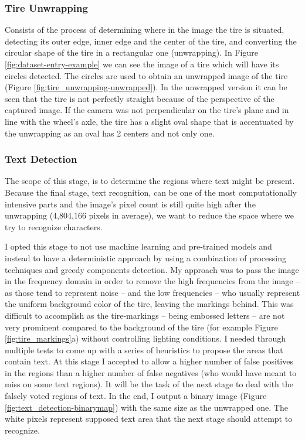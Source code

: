 \subsubsection{Tire Unwrapping}

Consists of the process of determining where in the image the tire is situated, detecting its outer edge, inner edge and the center of the tire, and converting the circular shape of the tire in a rectangular one (unwrapping). In Figure \ref{fig:dataset-entry-example} we can see the image of a tire which will have its circles detected. The circles are used to obtain an unwrapped image of the tire (Figure \ref{fig:tire_unwrapping-unwrapped}). In the unwrapped version it can be seen that the tire is not perfectly straight because of the perspective of the captured image. If the camera was not perpendicular on the tire's plane and in line with the wheel's axle, the tire has a slight oval shape that is accentuated by the unwrapping as an oval has 2 centers and not only one.

\subsubsection{Text Detection}

The scope of this stage, is to determine the regions where text might be present. Because the final stage, text recognition, can be one of the most computationally intensive parts and the image's pixel count is still quite high after the unwrapping (4,804,166 pixels in average), we want to reduce the space where we try to recognize characters.

I opted this stage to not use machine learning and pre-trained models and instead to have a deterministic approach by using a combination of processing techniques and greedy components detection. My approach was to pass the image in the frequency domain in order to remove the high frequencies from the image -- as those tend to represent noise -- and the low frequencies -- who usually represent the uniform background color of the tire, leaving the markings behind. This was difficult to accomplish as the tire-markings -- being embossed letters -- are not very prominent compared to the background of the tire (for example Figure \ref{fig:tire_markings}a) without controlling lighting conditions. I needed through multiple tests to come up with a series of heuristics to propose the areas that contain text. At this stage I accepted to allow a higher number of false positives in the regions than a higher number of false negatives (who would have meant to miss on some text regions). It will be the task of the next stage to deal with the falsely voted regions of text. In the end, I output a binary image (Figure \ref{fig:text_detection-binarymap}) with the same size as the unwrapped one. The white pixels represent supposed text area that the next stage should attempt to recognize.

